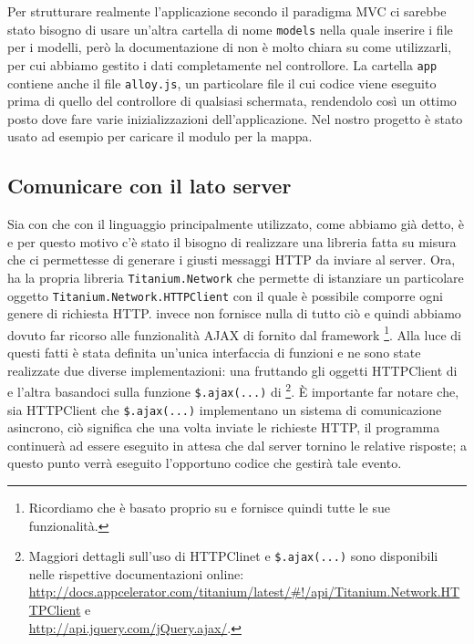 			\noindent Per strutturare realmente l'applicazione secondo il paradigma MVC 
			ci sarebbe stato bisogno di usare un'altra cartella di nome \texttt{models}
			nella quale inserire i file \js{} per i modelli, però la documentazione 
			di \tisdk{} non è molto chiara su come utilizzarli, per cui
			abbiamo gestito i dati completamente nel controllore. 
			\noindent La cartella \texttt{app} contiene anche il file \texttt{alloy.js}, un particolare file
			\js{} il cui codice viene eseguito prima di quello del controllore 
			di qualsiasi schermata, rendendolo così un ottimo posto dove fare 
			varie inizializzazioni dell'applicazione. Nel nostro progetto è 
			stato usato ad esempio per caricare il modulo per la mappa.
				
		\subsection{Comunicare con il lato server}
		\label{subsec:comlatoserver}
			Sia con \tisdk{} che con \pg{} il linguaggio principalmente utilizzato,
			come abbiamo già detto, è \js{} e per questo motivo c'è stato il bisogno
			di realizzare una libreria fatta su misura che ci permettesse di generare
			i giusti messaggi HTTP da inviare al server. Ora, \tisdk{} ha la propria
			libreria \texttt{Titanium.Network} che permette di istanziare un
			particolare oggetto	\texttt{Titanium.Network.HTTPClient} con il
			quale è possibile comporre ogni genere di richiesta HTTP. \pg{}
			invece non fornisce nulla di tutto ciò e quindi abbiamo dovuto far
			ricorso alle funzionalità AJAX di \jq{} fornito dal framework
			\kendomob{}\footnote{Ricordiamo che \kendomob{}	è basato proprio su
			\jq{} e fornisce quindi tutte le sue funzionalità.}. Alla luce di
			questi fatti è stata definita un'unica interfaccia di funzioni \js{}
			e ne sono state realizzate due diverse implementazioni: una
			fruttando gli oggetti HTTPClient di \tisdk{} e l'altra basandoci
			sulla funzione \verb|$.ajax(...)| di \jq{}\footnote{Maggiori
			dettagli sull'uso di HTTPClinet e \texttt{\$.ajax(...)} sono
			disponibili nelle rispettive documentazioni online:\\
			\url{http://docs.appcelerator.com/titanium/latest/\#!/api/Titanium.Network.HTTPClient}
			e\\ \url{http://api.jquery.com/jQuery.ajax/}.}.
			È importante far notare
			che, sia HTTPClient che \verb|$.ajax(...)| implementano un sistema
			di comunicazione asincrono, ciò significa che una volta inviate le
			richieste HTTP, il programma continuerà ad essere eseguito in attesa
			che dal server tornino le relative risposte; a questo punto verrà
			eseguito l'opportuno codice che gestirà tale evento.
			

